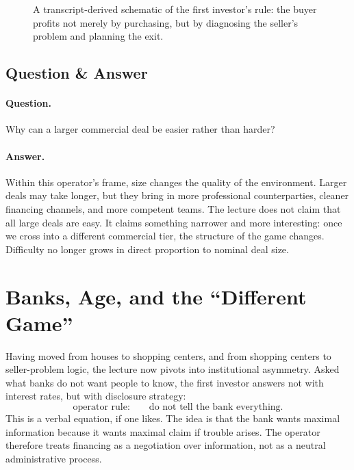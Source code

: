 \begin{figure}[h]
\centering
{}
\caption{A transcript-derived schematic of the first investor's rule: the buyer profits not merely by purchasing, but by diagnosing the seller's problem and planning the exit.}
\end{figure}

\subsection{Question \& Answer}

\paragraph{Question.} Why can a larger commercial deal be easier rather than harder?

\paragraph{Answer.} Within this operator's frame, size changes the quality of the environment. Larger deals may take longer, but they bring in more professional counterparties, cleaner financing channels, and more competent teams. The lecture does not claim that all large deals are easy. It claims something narrower and more interesting: once we cross into a different commercial tier, the structure of the game changes. Difficulty no longer grows in direct proportion to nominal deal size.

\section{Banks, Age, and the ``Different Game''}

Having moved from houses to shopping centers, and from shopping centers to seller-problem logic, the lecture now pivots into institutional asymmetry. Asked what banks do not want people to know, the first investor answers not with interest rates, but with disclosure strategy:
\begin{equation}
\text{operator rule:}\qquad \text{do not tell the bank everything}.
\end{equation}
This is a verbal equation, if one likes. The idea is that the bank wants maximal information because it wants maximal claim if trouble arises. The operator therefore treats financing as a negotiation over information, not as a neutral administrative process.

